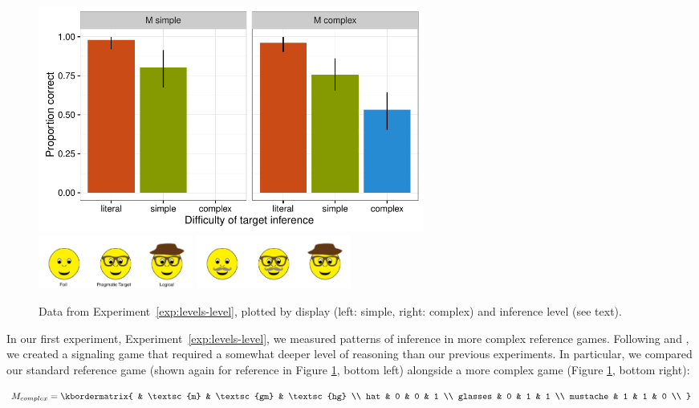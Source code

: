 \documentclass[man]{apa6}
\newcounter{Experiment}
\newcommand{\exptref}[1]{Experiment~\ref{#1}}
\begin{document}
 \begin{figure}[t]
  \centering
  \includegraphics[width=5in]{../plots/3-levels-levels.pdf}\\
  \hspace{6ex} \includegraphics[width=2in]{figures/hatglasses.pdf}\hspace{2ex}
  \includegraphics[width=2in]{figures/levels-levels-stim.pdf}
  \caption{\label{fig:levels-level} Data from \exptref{exp:levels-level}, plotted by display (left: simple, right: complex) and inference level (see text).}
\end{figure}

In our first experiment, \exptref{exp:levels-level}, we measured patterns of inference in more complex reference games. Following  and , we created a signaling game that required a somewhat deeper level of reasoning than our previous experiments. In particular, we compared our standard reference game (shown again for reference in Figure \ref{fig:levels-level}, bottom left) alongside a more complex game (Figure \ref{fig:levels-level}, bottom right):

\begin{equation}
    M_{complex} = \kbordermatrix{
      & \textsc{m} & \textsc{gm} & \textsc{hg} \\
      hat & 0 & 0 & 1  \\
      glasses & 0 & 1 & 1 \\
      mustache & 1 & 1 & 0 \\
    }
\end{equation}
\end{document}
